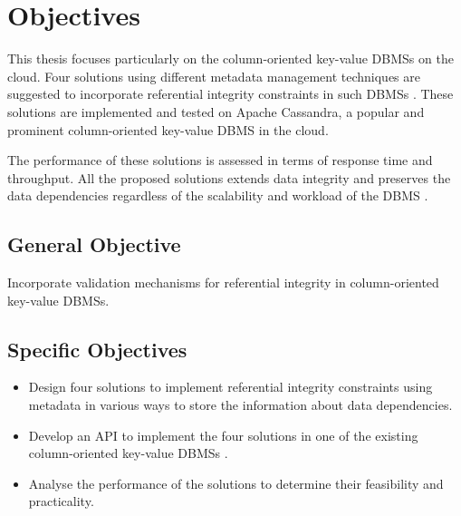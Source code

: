 \section{Objectives} 

This thesis  focuses particularly on the column-oriented
key-value \acp{DBMS}  on the cloud.  Four  solutions 
using different metadata management techniques are suggested to incorporate
referential integrity constraints in such \acp{DBMS} .  These
solutions are implemented and tested on Apache Cassandra, a popular and
prominent column-oriented key-value \ac{DBMS}  in the cloud. 

The performance of these solutions is assessed  in terms of response time and
throughput.  All the proposed solutions extends data integrity
and  preserves the data dependencies regardless of the scalability and workload
of the \ac{DBMS} . 

\subsection{General Objective}
 Incorporate validation mechanisms for referential integrity in column-oriented
 key-value \acp{DBMS}.

\subsection{Specific Objectives}
\begin{itemize} 
  \item Design four solutions to implement referential integrity constraints
  using metadata in various ways to store the information about data
  dependencies. 
  \item Develop an \ac{API}  to implement the four solutions in one of the
  existing column-oriented key-value \acp{DBMS} .  
  \item Analyse the performance of the solutions to determine their
   feasibility and practicality. 
\end{itemize} 


